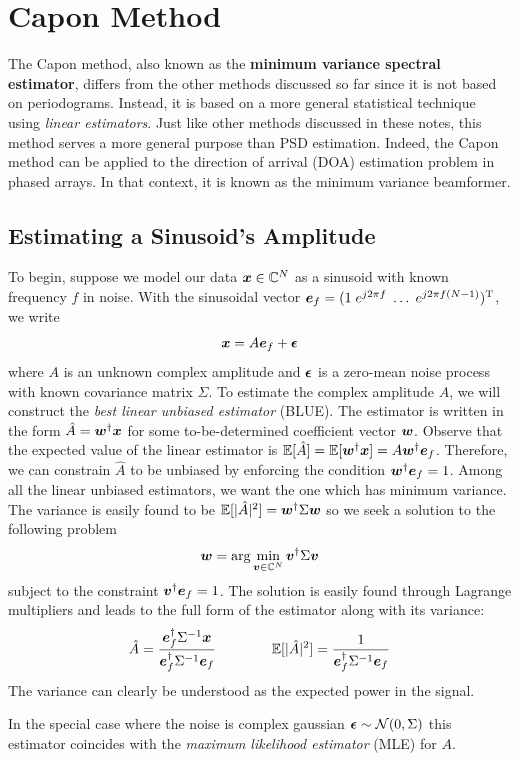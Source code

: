 \documentclass[twocolumn]{gwclass}
\newcommand{\C}{\mathbb{C}}
\begin{document}
\section{Capon Method}
The Capon method, also known as the \textbf{minimum variance spectral estimator}, differs from the other methods discussed so far since it is not based on periodograms. Instead, it is based on a more general statistical technique using \emph{linear estimators}. Just like other methods discussed in these notes, this method serves a more general purpose than PSD estimation. Indeed, the Capon method can be applied to the direction of arrival (DOA) estimation problem in phased arrays. In that context, it is known as the minimum variance beamformer.

\subsection{Estimating a Sinusoid's Amplitude}
To begin, suppose we model our data $\*x\in\C^N$ as a sinusoid with known frequency $f$ in noise. With the sinusoidal vector $\boldsymbol{e}_f=(1\;e^{j2\pi f}\;\dots\;e^{j2\pi f(N-1)})^{\text{\normalfont{T}}}$, we write
$$ \boldsymbol{x} = A\boldsymbol{e}_f + \boldsymbol{\epsilon} $$
where $A$ is an unknown complex amplitude and $\boldsymbol{\epsilon}$ is a zero-mean noise process with known covariance matrix $\Sigma$. To estimate the complex amplitude $A$, we will construct the \emph{best linear unbiased estimator} (BLUE). The estimator is written in the form $\hat{A}=\boldsymbol{w}^\dagger\boldsymbol{x}$ for some to-be-determined coefficient vector $\boldsymbol{w}$. Observe that the expected value of the linear estimator is $\mathbb{E}[\hat{A}]=\mathbb{E}[\boldsymbol{w}^\dagger\boldsymbol{x}]= A\boldsymbol{w}^\dagger\boldsymbol{e}_f$. Therefore, we can constrain $\hat{A}$ to be unbiased by enforcing the condition $ \boldsymbol{w}^\dagger\boldsymbol{e}_f=1 $. Among all the linear unbiased estimators, we want the one which has minimum variance. The variance is easily found to be $\mathbb{E}[|\hat{A}|^2]=\boldsymbol{w}^\dagger \Sigma\boldsymbol{w}$ so we seek a solution to the following problem
$$ \*w = \arg\min_{\*v\in\C^N} \*v^\dagger\Sigma\*v$$
subject to the constraint $\boldsymbol{v}^\dagger\boldsymbol{e}_f=1$. The solution is easily found through Lagrange multipliers and leads to the full form of the estimator along with its variance:
$$ \hat{A} = \frac{\boldsymbol{e}_f^\dagger\Sigma^{-1} \boldsymbol{x}}{\boldsymbol{e}_f^\dagger \Sigma^{-1}\boldsymbol{e}_f} \qquad\qquad\mathbb{E}[|\hat{A}|^2]=\frac{1}{\boldsymbol{e}_f^\dagger\Sigma^{-1}\boldsymbol{e}_f}$$
The variance can clearly be understood as the expected power in the signal.

In the special case where the noise is complex gaussian $\boldsymbol{\epsilon}\sim\mathcal{N}(0,\Sigma)$ this estimator coincides with the \emph{maximum likelihood estimator} (MLE) for $A$.
\end{document}

